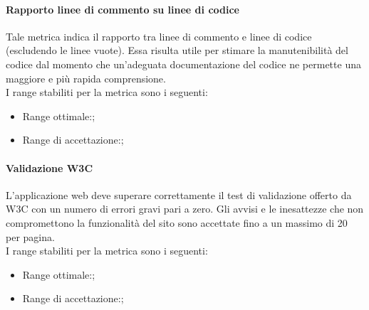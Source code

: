 			\paragraph{Rapporto linee di commento su linee di codice}
			Tale metrica indica il rapporto tra linee di commento e linee di codice (escludendo le linee vuote).
			Essa risulta utile per stimare la manutenibilità del codice dal momento che un'adeguata documentazione del codice ne permette una maggiore e più rapida comprensione.
			\\I range stabiliti per la metrica sono i seguenti:
			\begin{itemize}
				\item Range ottimale:;
				\item Range di accettazione:;
			\end{itemize}
			
			\paragraph{Validazione W3C}
			L'applicazione web deve superare correttamente il test di validazione offerto da W3C con un numero di errori gravi pari a zero. Gli avvisi e le inesattezze che non compromettono la funzionalità del sito sono accettate fino a un massimo di 20 per pagina.
			\\I range stabiliti per la metrica sono i seguenti:
			\begin{itemize}
				\item Range ottimale:;
				\item Range di accettazione:;
			\end{itemize}
	
